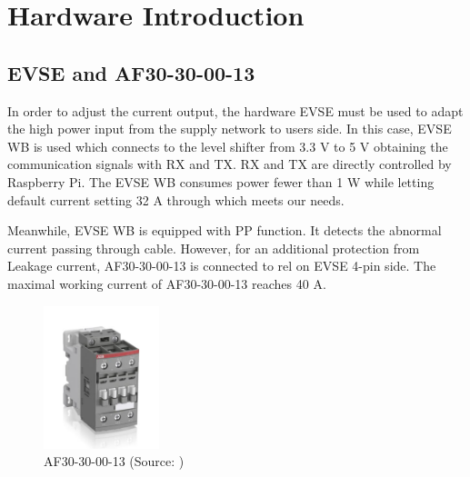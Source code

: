 \documentclass[
english,
ruledheaders=section,%
class=report,%
thesis={type=Report},%
accentcolor=9c,%
custommargins=true,%
marginpar=false,%
parskip=half-,%
fontsize=11pt,%
logofile={img/tuda_logo.pdf}, %
]{tudapub}
\begin{document}

    \newpage

    \chapter{Hardware Introduction}

    \section{EVSE and AF30-30-00-13}

    In order to adjust the current output, the hardware EVSE must be used to adapt the high power input from the supply network to users side. In this case, EVSE WB is used which connects to the level shifter from 3.3 V to 5 V obtaining the communication signals with RX and TX. RX and TX are directly controlled by Raspberry Pi. The EVSE WB consumes power fewer than 1 W while letting default current setting 32 A through which meets our needs.\cite{EVSEdatasheet}

    Meanwhile, EVSE WB is equipped with PP function. It detects the abnormal current passing through cable. \cite{typ2connector} However, for an additional protection from Leakage current, AF30-30-00-13 is connected to rel on EVSE 4-pin side. The maximal working current of AF30-30-00-13 reaches 40 A.\cite{AF30-30-00-13}

    \begin{figure}[htbp]
        \centering
        \includegraphics[width=0.3\textwidth]{img/AF30-30-00-13.jpg}
        \caption{AF30-30-00-13
            (Source: \cite{AF30-30-00-13})}
        \label{fig:AF30-30-00-13}
    \end{figure}


\end{document}
